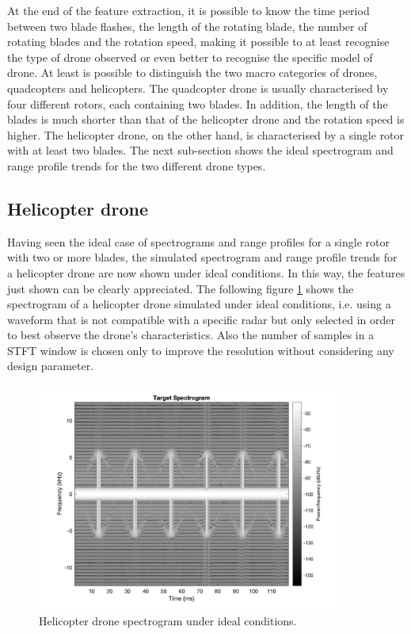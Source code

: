 At the end of the feature extraction, it is possible to know the time period between two blade flashes, the length of the rotating blade, the number of rotating blades and the rotation speed, making it possible to at least recognise the type of drone observed or even better to recognise the specific model of drone. At least is possible to distinguish the two macro categories of drones, quadcopters and helicopters. The quadcopter drone is usually characterised by four different rotors, each containing two blades. In addition, the length of the blades is much shorter than that of the helicopter drone and the rotation speed is higher. The helicopter drone, on the other hand, is characterised by a single rotor with at least two blades. 
The next sub-section shows the ideal spectrogram and range profile trends for the two different drone types.

\subsection{Helicopter drone}
Having seen the ideal case of spectrograms and range profiles for a single rotor with two or more blades, the simulated spectrogram and range profile trends for a helicopter drone are now shown under ideal conditions. In this way, the features just shown can be clearly appreciated. The following figure \ref{ideal_helic_spect} shows the spectrogram of a helicopter drone simulated under ideal conditions, i.e. using a waveform that is not compatible with a specific radar but only selected in order to best observe the drone's characteristics. Also the number of samples in a STFT window is chosen only to improve the resolution without considering any design parameter. 

\begin{figure}[h!]
\centering
\includegraphics[width=10cm]{FMCW mD analysis-chap4/img/helicopter_ideal_spectrogram.jpg}
\caption{Helicopter drone spectrogram under ideal conditions.\cite{tesiligresti}}
\label{ideal_helic_spect}
\end{figure}

